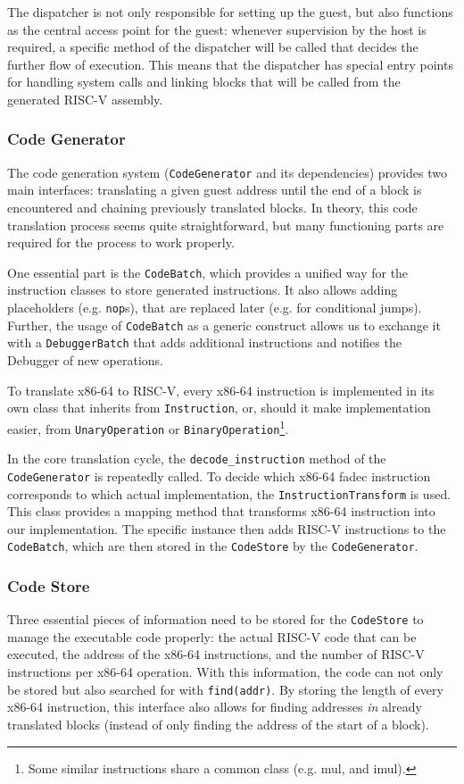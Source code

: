 		The dispatcher is not only responsible for setting up the guest, but also functions as the central access point for the guest: whenever supervision by the host is required, a specific method of the dispatcher will be called that decides the further flow of execution. This means that the dispatcher has special entry points for handling system calls and linking blocks that will be called from the generated RISC-V assembly. 
	
	\subsubsection{Code Generator}
		The code generation system (\texttt{CodeGenerator} and its dependencies) provides two main interfaces: translating a given guest address until the end of a block is encountered and chaining previously translated blocks. In theory, this code translation process seems quite straightforward, but many functioning parts are required for the process to work properly.
		
		One essential part is the \texttt{CodeBatch}, which provides a unified way for the instruction classes to store generated instructions. It also allows adding placeholders (e.g. \texttt{nop}s), that are replaced later (e.g. for conditional jumps). Further, the usage of \texttt{CodeBatch} as a generic construct allows us to exchange it with a \texttt{DebuggerBatch} that adds additional instructions and notifies the Debugger of new operations. 

		To translate x86-64 to RISC-V, every x86-64 instruction is implemented in its own class that inherits from \texttt{Instruction}, or, should it make implementation easier, from \texttt{UnaryOperation} or \texttt{BinaryOperation}\footnote{Some similar instructions share a common class (e.g. mul, and imul).}.
		
		In the core translation cycle, the \texttt{decode\_instruction} method of the \texttt{CodeGenerator} is repeatedly called. To decide which x86-64 fadec instruction corresponds to which actual implementation, the \texttt{InstructionTransform} is used. This class provides a mapping method that transforms x86-64 instruction into our implementation. The specific instance then adds RISC-V instructions to the \texttt{CodeBatch}, which are then stored in the \texttt{CodeStore} by the \texttt{CodeGenerator}.

	\subsubsection{Code Store}
		Three essential pieces of information need to be stored for the \texttt{CodeStore} to manage the executable code properly: the actual RISC-V code that can be executed, the address of the x86-64 instructions, and the number of RISC-V instructions per x86-64 operation. With this information, the code can not only be stored but also searched for with \texttt{find(addr)}. By storing the length of every x86-64 instruction, this interface also allows for finding addresses \emph{in} already translated blocks (instead of only finding the address of the start of a block).
		
